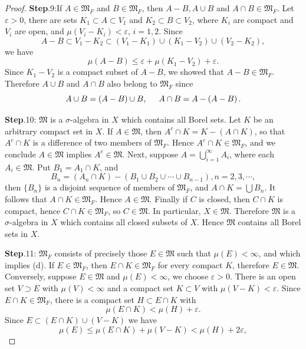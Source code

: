 \begin{proof}
\textbf{Step}.9:If $A\in\mathfrak{M}_F$ and $B\in\mathfrak{M}_F$, then $A-B,A\cup B$ and $A\cap B\in\mathfrak{M}_F$. Let $\varepsilon>0$, there are sets $K_1\subset A\subset V_1$ and $K_2\subset B\subset V_2$, where $K_i$ are compact and $V_i$ are open, and $\mu(V_i-K_i)<\varepsilon$, $i=1,2$. Since 
$$
A-B\subset V_1-K_2\subset \left( V_1-K_1 \right) \cup \left( K_1-V_2 \right) \cup \left( V_2-K_2 \right) ,
$$
we have 
$$
\mu \left( A-B \right) \le \varepsilon +\mu \left( K_1-V_2 \right) +\varepsilon .
$$
Since $K_1-V_2$ is a compact subset of $A-B$, we showed that $A-B\in\mathfrak{M}_F$. Therefore $A\cup B$ and $A\cap B$ also belong to $\mathfrak{M}_F$ since 
$$
A\cup B=\left( A-B \right) \cup B,\hspace{0.5cm}A\cap B=A-\left( A-B \right) .
$$\par
\textbf{Step}.10: $\mathfrak{M}$ is a $\sigma$-algebra in $X$ which contains all Borel sets. Let $K$ be an arbitrary compact set in $X$. If $A\in\mathfrak{M}$, then $A^c\cap K=K-(A\cap K)$, so that $A^c\cap K$ is a difference of two members of $\mathfrak{M}_F$. Hence $A^c\cap K\in\mathfrak{M}_F$, and we conclude $A\in\mathfrak{M}$ implies $A^c\in\mathfrak{M}$. Next, suppose $A=\bigcup_{i=1}^\infty A_i$, where each $A_i\in\mathfrak{M}$. Put $B_1=A_1\cap K$, and 
$$
B_n=\left( A_n\cap K \right) -\left( B_1\cup B_2\cup \cdots \cup B_{n-1} \right) ,n=2,3,\cdots ,
$$
then $\{B_n\}$ is a disjoint sequence of members of $\mathfrak{M}_F$, and $A\cap K=\bigcup B_n$. It follows that $A\cap K\in\mathfrak{M}_F$. Hence $A\in\mathfrak{M}$. Finally if $C$ is closed, then $C\cap K$ is compact, hence $C\cap K\in\mathfrak{M}_F$, so $C\in\mathfrak{M}$. In particular, $X\in\mathfrak{M}$. Therefore $\mathfrak{M}$ is a $\sigma$-algebra in $X$ which contains all closed subsets of $X$. Hence $\mathfrak{M}$ contains all Borel sets in $X$.\par
\textbf{Step}.11: $\mathfrak{M}_F$ consists of precisely those $E\in\mathfrak{M}$ such that $\mu(E)<\infty$, and which implies (d). If $E\in\mathfrak{M}_F$, then $E\cap K\in\mathfrak{M}_F$ for every compact $K$, therefore $E\in\mathfrak{M}$. Conversely, suppose $E\in\mathfrak{M}$ and $\mu(E)<\infty$, we choose $\varepsilon>0$. There is an open set $V\supset E$ with $\mu(V)<\infty$ and a compact set $K\subset V$ with $\mu(V-K)<\varepsilon$. Since $E\cap K\in\mathfrak{M}_F$, there is a compact set $H\subset E\cap K$ with 
$$\mu(E\cap K)<\mu(H)+\varepsilon.$$
Since $E\subset \left( E\cap K \right) \cup \left( V-K \right) $ we have 
$$
\mu \left( E \right) \le \mu \left( E\cap K \right) +\mu \left( V-K \right) <\mu \left( H \right) +2\varepsilon ,
$$
\end{proof}
